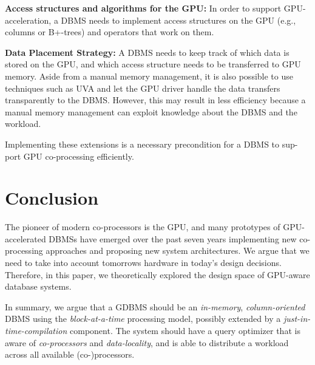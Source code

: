 \documentclass[twocolumn]{article}
\begin{document}
\noindent
\textbf{Access structures and algorithms for the GPU:} In order to support GPU- acceleration, a DBMS needs to implement access structures on the GPU (e.g., columns or B+-trees) and operators that work on them. 

\noindent
\textbf{Data Placement Strategy:} A DBMS needs to keep track of which data is stored on the GPU, and which access structure needs to be transferred to GPU memory. Aside from a manual memory management, it is also possible to use techniques such as UVA and let the GPU driver handle the data transfers transparently to the DBMS. However, this may result in less efficiency because a manual memory management can exploit knowledge about the DBMS and the workload.

Implementing these extensions is a necessary precondition for a DBMS to sup- port GPU co-processing efficiently.



\section{Conclusion}
The pioneer of modern co-processors is the GPU, and many prototypes of GPU-accelerated DBMSs have emerged over the past seven years implementing new co-processing approaches and proposing new system architectures. We argue that we need to take into account tomorrows hardware in today's design decisions. Therefore, in this paper, we theoretically explored the design space of GPU-aware database systems. 

In summary, we argue that a GDBMS should be an \textit{in-memory}, \textit{column-oriented} DBMS using the \textit{block-at-a-time} processing model, possibly extended by a \textit{just-in-time-compilation} component. The system should have a query optimizer that is aware of \textit{co-processors} and \textit{data-locality}, and is able to distribute a workload across all available (co-)processors.




\end{document}
